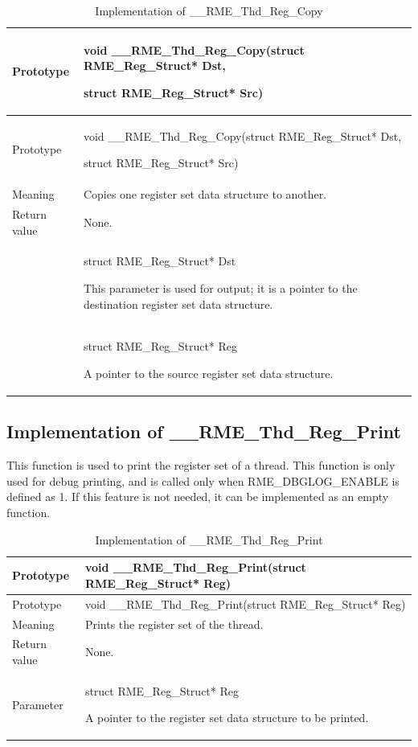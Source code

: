 \begin{xltabular}{\textwidth}{@{}>{\hsize\raggedright\arraybackslash}X>{\hsize\raggedright\arraybackslash}X@{}}
\caption{Implementation of \_\_RME\_Thd\_Reg\_Copy}\label{tab:7-64-rme-thd-reg-copy-implementation}\\
\toprule
Prototype\strut
 & void \_\_RME\_Thd\_Reg\_Copy(struct RME\_Reg\_Struct* Dst,

struct RME\_Reg\_Struct* Src)\strut
\tabularnewline
\endfirsthead
\toprule
Prototype\strut
 & void \_\_RME\_Thd\_Reg\_Copy(struct RME\_Reg\_Struct* Dst,

struct RME\_Reg\_Struct* Src)\strut
\tabularnewline
\midrule
\endhead
\bottomrule
\endlastfoot
Meaning & Copies one register set data structure to another.\tabularnewline
Return value & None.\tabularnewline
{} & struct RME\_Reg\_Struct* Dst

This parameter is used for output; it is a pointer to the destination register set data structure.\strut
\tabularnewline
\strut
 & struct RME\_Reg\_Struct* Reg

A pointer to the source register set data structure.\strut
\tabularnewline
\end{xltabular}
\nopagebreak[4]

\subsection{Implementation of \_\_RME\_Thd\_Reg\_Print}\label{subsec:7-rme-thd-reg-print-implementation}

This function is used to print the register set of a thread. This function is only used for debug printing, and is called only when RME\_DBGLOG\_ENABLE is defined as 1. If this feature is not needed, it can be implemented as an empty function.

\begin{xltabular}{\textwidth}{@{}>{\hsize\raggedright\arraybackslash}X>{\hsize\raggedright\arraybackslash}X@{}}
\caption{Implementation of \_\_RME\_Thd\_Reg\_Print}\label{tab:7-65-rme-thd-reg-print-implementation}\\
\toprule
Prototype & void \_\_RME\_Thd\_Reg\_Print(struct RME\_Reg\_Struct*
Reg)\tabularnewline
\endfirsthead
\toprule
Prototype & void \_\_RME\_Thd\_Reg\_Print(struct RME\_Reg\_Struct*
Reg)\tabularnewline
\midrule
\endhead
\bottomrule
\endlastfoot
Meaning & Prints the register set of the thread.\tabularnewline
Return value & None.\tabularnewline
Parameter\strut
 & struct RME\_Reg\_Struct* Reg

A pointer to the register set data structure to be printed.\strut
\tabularnewline
\end{xltabular}
\nopagebreak[4]


